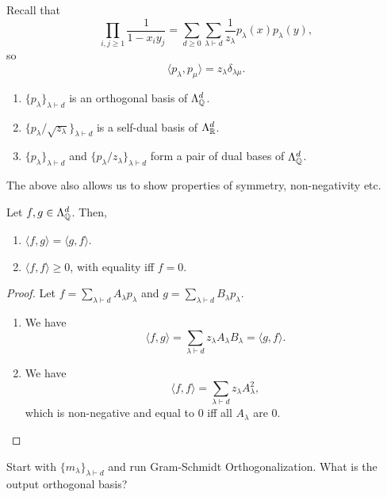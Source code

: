
	Recall that
	\[ \prod_{i,j \ge 1} \frac{1}{1-x_iy_j} = \sum_{d \ge 0} \sum_{\lambda \vdash d} \frac{1}{z_\lambda} p_\lambda(x) p_\lambda(y), \]
	so
	\[ \langle  p_\lambda , p_\mu \rangle = z_\lambda \delta_{\lambda\mu}. \]

	\begin{fcor}
		\phantom{pain}
		\begin{enumerate}
			\item $\{ p_\lambda \}_{\lambda \vdash d}$ is an orthogonal basis of $\Lambda_{\mathbb{Q}}^d$.
			\item $\{ p_\lambda/\sqrt{z_\lambda} \}_{\lambda \vdash d}$ is a self-dual basis of $\Lambda_{\mathbb{R}}^d$.
			\item $\{ p_\lambda \}_{\lambda \vdash d}$ and $\{p_\lambda/z_\lambda\}_{\lambda\vdash d}$ form a pair of dual bases of $\Lambda_{\mathbb{Q}}^d$.
		\end{enumerate}
	\end{fcor}

	The above also allows us to show properties of symmetry, non-negativity etc.

	\begin{fcor}
		Let $f,g \in \Lambda_{\mathbb{Q}}^d$. Then,
		\begin{enumerate}
			\item $\langle f,g\rangle = \langle g,f\rangle$.
			\item $\langle f,f\rangle \ge 0$, with equality iff $f = 0$.
		\end{enumerate}
	\end{fcor}
	\begin{proof}
		Let $f = \sum_{\lambda \vdash d} A_\lambda p_\lambda$ and $g = \sum_{\lambda \vdash d} B_\lambda p_\lambda$. 
		\begin{enumerate}
			\item We have
			\[ \langle f,g \rangle = \sum_{\lambda \vdash d} z_\lambda A_\lambda B_\lambda = \langle g,f\rangle. \]
			\item We have
			\[ \langle f,f\rangle = \sum_{\lambda \vdash d} z_\lambda A_\lambda^2, \]
			which is non-negative and equal to $0$ iff all $A_\lambda$ are $0$. \qedhere
		\end{enumerate}
	\end{proof}

		Start with $\{m_\lambda\}_{\lambda\vdash d}$ and run Gram-Schmidt Orthogonalization. What is the output orthogonal basis?

